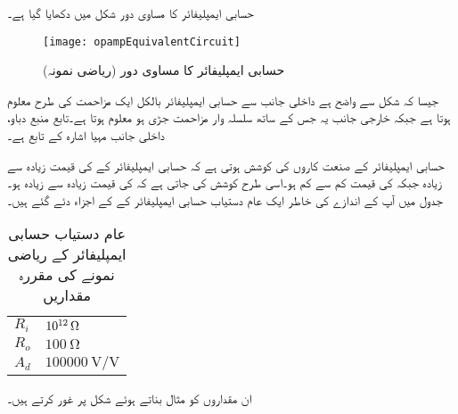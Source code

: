 حسابی ایمپلیفائر کا مساوی دور شکل  میں دکھایا گیا ہے۔
\begin{figure}
\centering
\texttt{[image: opampEquivalentCircuit]}
\caption{حسابی ایمپلیفائر کا مساوی دور (ریاضی نمونہ)}
\label{شکل_حسابی_ایمپلیفائر_کا_مساوی_دور}
\end{figure}
جیسا کہ شکل سے واضح ہے داخلی جانب سے حسابی ایمپلیفائر بالکل ایک مزاحمت  کی طرح معلوم ہوتا ہے جبکہ خارجی جانب  یہ  جس کے ساتھ سلسلہ وار مزاحمت  جڑی ہو معلوم ہوتا ہے۔تابع منبع دباو،  داخلی جانب مہیا اشارہ  کے تابع ہے۔

	حسابی ایمپلیفائر کے صنعت کاروں کی کوشش ہوتی ہے کہ حسابی ایمپلیفائر کے   کی قیمت زیادہ سے زیادہ جبکہ    کی قیمت کم سے کم ہو۔اسی طرح کوشش کی جاتی ہے کہ    کی قیمت زیادہ سے زیادہ ہو۔جدول  میں آپ کے اندازے کی خاطر ایک عام دستیاب حسابی ایمپلیفائر کے   کے اجزاء دئے گئے ہیں۔
\begin{table}[ht]
\caption{عام دستیاب حسابی ایمپلیفائر کے ریاضی نمونے کی مقررہ مقداریں}
\label{جدول_حسابی_ایمپلیفائر_عمومی_مقداریں}
\centering
\begin{tabular}{l l}
\toprule
$R_i$ &  $\SI{e{12}}{\ohm}$ \\
$R_o$ & $\SI{100}{\ohm}$\\
$A_d$  & $\SI{100000}{\volt \per \volt}$ \\
\bottomrule
\end{tabular}
\end{table}
ان مقداروں کو مثال بناتے ہوئے شکل  پر غور کرتے ہیں۔


